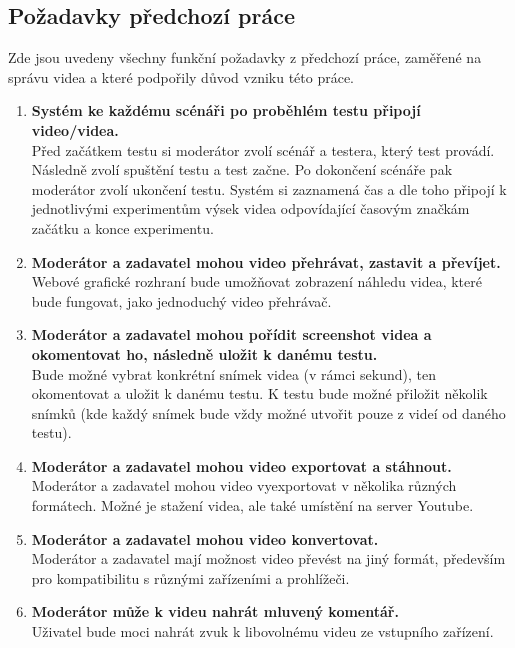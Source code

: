 \documentclass[thesis=M,czech]{FITthesis}[2012/06/26]
\begin{document}
\subsection{Požadavky předchozí práce} \label{subsec:analyza_predchozi_prace_pozadavky}
Zde jsou uvedeny všechny funkční požadavky z předchozí práce, zaměřené na správu videa a které podpořily důvod vzniku této práce.
\begin{enumerate}
	\item \textbf{Systém ke každému scénáři po proběhlém testu připojí video/videa.\\}
Před začátkem testu si moderátor zvolí scénář a testera, který test provádí. Následně zvolí spuštění testu a test začne. Po dokončení scénáře pak moderátor zvolí ukončení testu. Systém si zaznamená čas a dle toho připojí k jednotlivými experimentům výsek videa odpovídající časovým značkám začátku a konce experimentu.

	\item \textbf{Moderátor a zadavatel mohou video přehrávat, zastavit a převíjet.\\}
Webové grafické rozhraní bude umožňovat zobrazení náhledu videa, které bude fungovat, jako jednoduchý video přehrávač.

	\item \textbf{Moderátor a zadavatel mohou pořídit screenshot videa a okomentovat ho, následně uložit k danému testu.\\}
Bude možné vybrat konkrétní snímek videa (v rámci sekund), ten okomentovat a uložit k danému testu. K testu bude možné přiložit několik snímků (kde každý snímek bude vždy možné utvořit pouze z videí od daného testu).

	\item \textbf{Moderátor a zadavatel mohou video exportovat a stáhnout.\\}
Moderátor a zadavatel mohou video vyexportovat v několika různých formátech. Možné je stažení videa, ale také umístění na server Youtube.

	\item \textbf{Moderátor a zadavatel mohou video konvertovat.\\}
Moderátor a zadavatel mají možnost video převést na jiný formát, především pro kompatibilitu s různými zařízeními a prohlížeči.

	\item \textbf{Moderátor může k videu nahrát mluvený komentář.\\}
Uživatel bude moci nahrát zvuk k libovolnému videu ze vstupního zařízení.
\end{enumerate}
\end{document}
